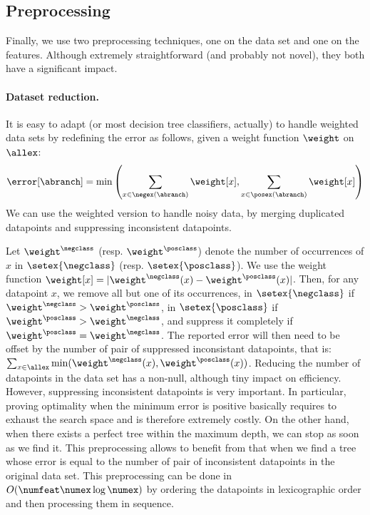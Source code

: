 \documentclass{llncs}
\begin{document}









\subsection{Preprocessing}
\label{sec:preprocessing}

Finally, we use two preprocessing techniques, one on the data set and one on the features. Although extremely straightforward (and probably not novel), they both have a significant impact.

\paragraph{Dataset reduction.}
It is easy to adapt \budalg (or most decision tree classifiers, actually) to handle weighted data sets by redefining the error as follows, given a weight function $\weight$ on $\allex$:
$$
\error[\abranch] = \min\left( \sum\limits_{x \in \negex(\abranch)}\weight[x], \sum\limits_{x \in \posex(\abranch)}\weight[x] \right)
$$
We can use the weighted version to handle noisy data, by merging duplicated datapoints and suppressing inconsistent datapoints.

Let $\weight^{\negclass}$ (resp. $\weight^{\posclass}$) denote the number of occurrences of $x$ in $\setex{\negclass}$ (resp. $\setex{\posclass}$). We use the weight function $\weight[x] = |\weight^{\negclass}(x) - \weight^{\posclass}(x)|$. Then, for any datapoint $x$, we remove all but one of its occurrences, in $\setex{\negclass}$ if $\weight^{\negclass}>\weight^{\posclass}$, in $\setex{\posclass}$ if $\weight^{\posclass}>\weight^{\negclass}$, and suppress it completely if $\weight^{\posclass}=\weight^{\negclass}$.
The reported error will then need to be offset by the number of pair of suppressed inconsistant datapoints, that is:
$
\sum_{x \in \allex}\min(\weight^{\negclass}(x), \weight^{\posclass}(x))
$.
Reducing the number of datapoints in the data set has a non-null, although tiny impact on efficiency. However, suppressing inconsistent datapoints is very important. In particular, proving optimality when the minimum error is positive basically requires to exhaust the search space and is therefore extremely costly. On the other hand, when there exists a perfect tree within the maximum depth, we can stop as soon as we find it. This preprocessing allows to benefit from that when we find a tree whose error is equal to the number of pair of inconsistent datapoints in the original data set.
This preprocessing can be done in $O(\numfeat \numex \log \numex)$ by ordering the datapoints in lexicographic order and then processing them in sequence.
\end{document}
